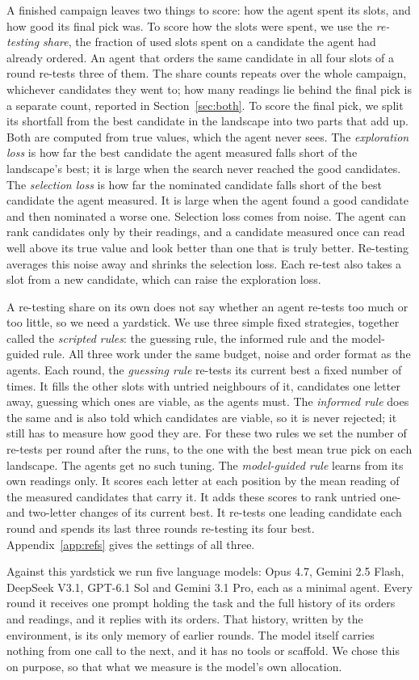 A finished campaign leaves two things to score: how the agent spent its slots, and how good its final pick was. To score how the slots were spent, we use the \emph{re-testing share}, the fraction of used slots spent on a candidate the agent had already ordered. An agent that orders the same candidate in all four slots of a round re-tests three of them.
The share counts repeats over the whole campaign, whichever candidates they went to; how many readings lie behind
the final pick is a separate count, reported in Section~\ref{sec:both}. To score the final pick, we split its shortfall from the best candidate in the landscape into two parts that add up. Both are computed from true values, which the agent never sees. The \emph{exploration loss} is how far the best candidate the agent measured
falls short of the landscape's best; it is large when the search never reached the good candidates. The
\emph{selection loss} is how far the nominated candidate falls short of the best candidate the agent measured. It is large when the agent found a good candidate and then nominated a worse one. Selection loss comes from noise. The agent can rank
candidates only by their readings, and a candidate measured once can read well above its true value and look better
than one that is truly better. Re-testing averages this noise away and shrinks the selection loss. Each re-test also takes a slot from a new candidate, which can raise the exploration loss.

A re-testing share on its own does not say whether an agent re-tests too much or too little, so we need a yardstick.
We use three simple fixed strategies, together called the \emph{scripted rules}: the guessing rule, the informed
rule and the model-guided rule. All three work under the same budget, noise and order format as the agents. Each round, the \emph{guessing rule} re-tests its current best a fixed number of times. It fills the other slots
with untried neighbours of it, candidates one letter away, guessing which ones are viable, as the agents must. The \emph{informed rule} does the same and is also told which candidates are viable, so it is never rejected; it still has to measure how good they are. For these two rules we set the number of re-tests per round after the runs, to the one with the best mean true pick on each landscape. The agents get no such tuning. The \emph{model-guided rule} learns from its own
readings only. It scores each letter at each position by the mean reading of the measured candidates that carry it. It adds these scores to rank untried one- and two-letter changes of its current best. It re-tests one leading
candidate each round and spends its last three rounds re-testing its four best. Appendix~\ref{app:refs} gives the
settings of all three.

Against this yardstick we run five language models: Opus 4.7, Gemini 2.5 Flash, DeepSeek V3.1, GPT-6.1 Sol and
Gemini 3.1 Pro, each as a minimal agent. Every round it receives one prompt holding the task and the full history of its orders and readings, and it replies with its orders. That history, written by the environment, is its only memory of earlier rounds. The model itself carries nothing from one call to the next, and it has no tools or scaffold. We chose this on purpose, so that what we measure is the model's own allocation. 

